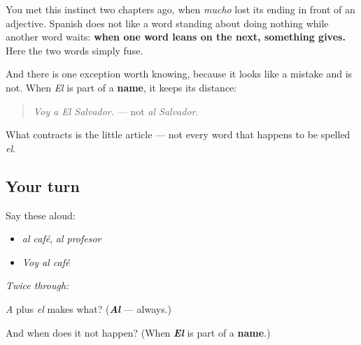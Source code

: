 \begin{culture}
You met this instinct two chapters ago, when \emph{mucho} lost its ending in front of an adjective. Spanish does not like a word standing about doing nothing while another word waits: \textbf{when one word leans on the next, something gives.} Here the two words simply fuse.

And there is one exception worth knowing, because it looks like a mistake and is not. When \emph{El} is part of a \textbf{name}, it keeps its distance:

\begin{quote}
\emph{Voy a El Salvador.} — not \emph{al Salvador}.
\end{quote}

What contracts is the little article — not every word that happens to be spelled \emph{el}.
\end{culture}

\subsection*{Your turn}
Say these aloud:

\begin{itemize}
\raggedright
  \item \emph{al café}, \emph{al profesor}
  \item \emph{Voy al café}
\end{itemize}

\emph{Twice through:}

\begin{tcolorbox}[breakable,colback=teal!4,colframe=teal!35!black,title={Before you move on}]
\emph{A} plus \emph{el} makes what? (\emph{\textbf{Al}} — always.)

And when does it not happen? (When \emph{\textbf{El}} is part of a \textbf{name}.)
\end{tcolorbox}
